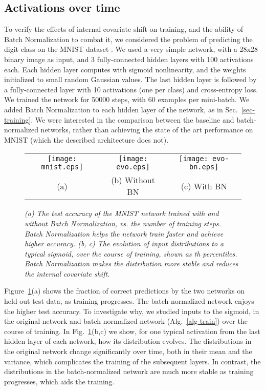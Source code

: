 \documentclass[twocolumn]{article}
\begin{document}
\subsection{Activations over time}


To verify the effects of internal covariate shift on training, and the ability of Batch
Normalization to combat it, we considered the problem of predicting the digit
class on the MNIST dataset \cite{mnist}. We used a very simple network, with  a 28x28
binary image as  input, and  3 fully-connected hidden layers with 100 activations each. 
 Each hidden layer computes  with  sigmoid nonlinearity, and the weights  initialized to small random  Gaussian values. The last hidden layer is followed by a fully-connected layer with 10 activations (one per class) and  cross-entropy loss. We trained the network for 50000
steps, with  60 examples per mini-batch. We added Batch Normalization to each hidden layer of the network, as in Sec.~\ref{sec-training}.
 We were interested in the
comparison between the baseline and batch-normalized networks, rather than
achieving the state of the art performance on MNIST (which the described
architecture does not).


\begin{figure}
\centering
\begin{tabular}{@{}c@{\,}c@{}c@{}}
\texttt{[image: mnist.eps]}
&
\texttt{[image: evo.eps]}&
\texttt{[image: evo-bn.eps]}\\
(a)&(b) Without BN&(c) With BN
\end{tabular} 
\caption{\em {\em(a)} The test accuracy of the MNIST network trained with and without Batch Normalization, vs. the number of training steps. Batch Normalization helps the network train faster and achieve higher accuracy. {\em(b, c)}   The evolution of input distributions to a typical sigmoid, over the course of training, shown as th percentiles. Batch Normalization makes the distribution more stable and reduces the internal covariate shift.}
\label{fig-mnist}
\end{figure}

Figure~\ref{fig-mnist}(a) shows the fraction of correct predictions  by the two networks on
held-out test data, as training progresses. The batch-normalized network enjoys the higher test accuracy. To investigate why, we studied inputs to the sigmoid, in the original network  and  batch-normalized network  (Alg.~\ref{alg-train}) over the course of training. In Fig.~\ref{fig-mnist}(b,c) we show, for one typical activation from the last hidden layer of each network, how its distribution evolves.  The distributions in the original network
change significantly over time, both in their mean and the variance, which complicates the training of the subsequent layers.  In
contrast, the distributions in the batch-normalized network are much more stable
as training progresses, which aids the training.
\end{document}
